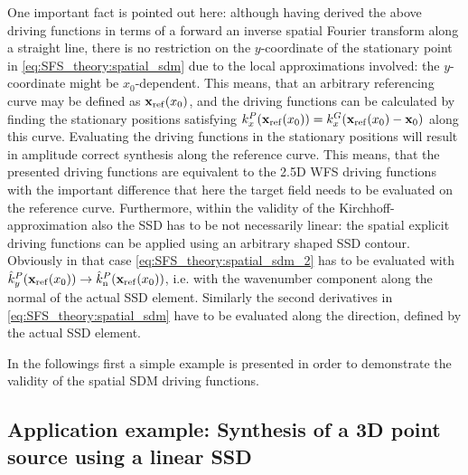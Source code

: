 One important fact is pointed out here: although having derived the above driving functions in terms of a forward an inverse spatial Fourier transform along a straight line, there is no restriction on the $y$-coordinate of the stationary point in \eqref{eq:SFS_theory:spatial_sdm} due to the local approximations involved: the $y$-coordinate might be $x_0$-dependent.
This means, that an arbitrary referencing curve may be defined as $\mathbf{x}_{\mathrm{ref}}(x_0)$, and the driving functions can be calculated by finding the stationary positions 
satisfying $k_x^P(\mathbf{x}_{\mathrm{ref}}(x_0)) = k_x^G(\mathbf{x}_{\mathrm{ref}}(x_0) - \mathbf{x}_0)$ along this curve.
Evaluating the driving functions in the stationary positions will result in amplitude correct synthesis along the reference curve. 
This means, that the presented driving functions are equivalent to the 2.5D WFS driving functions with the important difference that here the target field needs to be evaluated on the reference curve.
Furthermore, within the validity of the Kirchhoff-approximation also the SSD has to be not necessarily linear: the spatial explicit driving functions can be applied using an arbitrary shaped SSD contour.
Obviously in that case \eqref{eq:SFS_theory:spatial_sdm_2} has to be evaluated with $\hat{k}_y^{P}(\mathbf{x}_{\mathrm{ref}}(x_0)) \rightarrow \hat{k}_{\mathrm{n}}^{P}(\mathbf{x}_{\mathrm{ref}}(x_0))$, i.e. with the wavenumber component along the normal of the actual SSD element.
Similarly the second derivatives in \eqref{eq:SFS_theory:spatial_sdm} have to be evaluated along the direction, defined by the actual SSD element.

In the followings first a simple example is presented in order to demonstrate the validity of the spatial SDM driving functions.

\subsection*{Application example: Synthesis of a 3D point source using a linear SSD}

